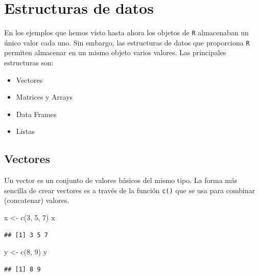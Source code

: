 \documentclass[
]{book}
\newenvironment{Shaded}{\begin{snugshade}}{\end{snugshade}}
\newcommand{\DecValTok}[1]{\textcolor[rgb]{0.00,0.00,0.81}{#1}}
\newcommand{\FunctionTok}[1]{\textcolor[rgb]{0.00,0.00,0.00}{#1}}
\newcommand{\NormalTok}[1]{#1}
\newcommand{\OtherTok}[1]{\textcolor[rgb]{0.56,0.35,0.01}{#1}}
\theoremstyle{break}
\theoremstyle{nonumberplain}
\begin{document}
\hypertarget{estructuras-de-datos}{%
\chapter{Estructuras de datos}\label{estructuras-de-datos}}

En los ejemplos que hemos visto hasta ahora los objetos de \texttt{R} almacenaban un único valor cada uno.
Sin embargo, las estructuras de datos que proporciona \texttt{R} permiten almacenar en un mismo objeto varios valores.
Las principales estructuras son:

\begin{itemize}
\item
  Vectores
\item
  Matrices y Arrays
\item
  Data Frames
\item
  Listas
\end{itemize}

\hypertarget{vectores}{%
\section{Vectores}\label{vectores}}

Un vector es un conjunto de valores básicos del mismo tipo.
La forma más sencilla de crear vectores es a
través de la función \texttt{c()} que se usa para combinar (concatenar) valores.

\begin{Shaded}
\begin{Highlighting}[]
\NormalTok{x }\OtherTok{\textless{}{-}} \FunctionTok{c}\NormalTok{(}\DecValTok{3}\NormalTok{, }\DecValTok{5}\NormalTok{, }\DecValTok{7}\NormalTok{)}
\NormalTok{x}
\end{Highlighting}
\end{Shaded}

\begin{verbatim}
## [1] 3 5 7
\end{verbatim}

\begin{Shaded}
\begin{Highlighting}[]
\NormalTok{y }\OtherTok{\textless{}{-}} \FunctionTok{c}\NormalTok{(}\DecValTok{8}\NormalTok{, }\DecValTok{9}\NormalTok{)}
\NormalTok{y}
\end{Highlighting}
\end{Shaded}

\begin{verbatim}
## [1] 8 9
\end{verbatim}
\end{document}
